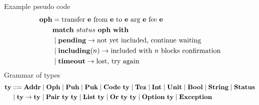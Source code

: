 \documentclass[a4paper]{llncs}
\begin{document}
Example pseudo code
\begin{align*}
  \OPH &=  \TRANSFER[\EXPR]\EXPR\EXPR\EXPR\EXPR \\
       & \MATCH\ {status\ \OPH}\ \WITH \\
       & \mid \STATUSPENDING \to \textrm{not yet included, continue waiting} \\
       & \mid \STATUSINCLUDING (n) \to \textrm{included with $n$
         blocks confirmation}\\
       & \mid \STATUSTIMEOUT \to \textrm{lost, try again}
\end{align*}
Grammar of types
\begin{align*}
  \TYPE & ::= \TADDR \mid \TOPH \mid \TPUH \mid \TPUK \mid \TCODE\
          \TYPE \mid \TTEZ \mid
          \TINT \mid \TUNIT \mid \TBOOL \mid \TSTRING \mid \TSTATUS \\
  & \mid \TYPE\to\TYPE \mid \TPAIR\ \TYPE\ \TYPE \mid \TLIST\ \TYPE
    \mid \TSUM\ \TYPE\ \TYPE \mid \TOPTION\ \TYPE \mid \TEXCEPTION
\end{align*}
\end{document}
